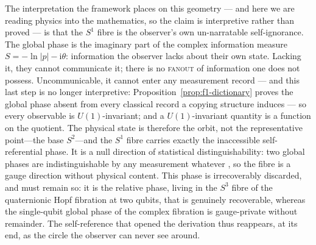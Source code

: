 The interpretation the framework places on this geometry --- and here we are reading physics
into the mathematics, so the claim is interpretive rather than proved --- is that the $S^{1}$
fibre is the observer's own un-narratable self-ignorance. The global phase is the imaginary part
of the complex information measure $S=-\ln\lvert p\rvert-\mathrm{i}\theta$: information the
observer lacks about their own state. Lacking it, they cannot communicate it; there is no
\textsc{fanout} of information one does not possess. Uncommunicable, it cannot enter any
measurement record --- and this last step is no longer interpretive:
Proposition~\ref{prop:f1-dictionary} proves the global phase absent from every classical record
a copying structure induces --- so every observable is $U(1)$-invariant; and a $U(1)$-invariant
quantity is a function on the quotient. The physical state is therefore the orbit, not the
representative point---the base $S^{2}$---and the $S^{1}$ fibre carries exactly the inaccessible
self-referential phase. It is a null direction of statistical distinguishability: two global
phases are indistinguishable by any measurement whatever \autocite{wooters_1981}, so the fibre
is a gauge direction without physical content. This phase is irrecoverably discarded, and must
remain so: it is the relative phase, living in the $S^{3}$ fibre of the quaternionic Hopf
fibration at two qubits, that is genuinely recoverable, whereas the single-qubit global phase of
the complex fibration is gauge-private without remainder. The self-reference that opened the
derivation thus reappears, at its end, as the circle the observer can never see around.

